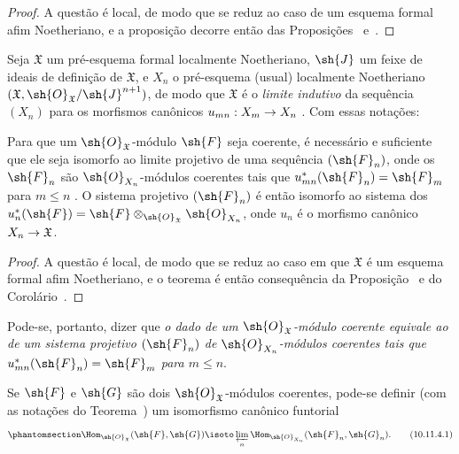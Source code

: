 \documentclass[oneside]{amsart}
\makeatletter
\renewcommand{\leq}{\leqslant}
\newcommand{\ega@arrow}[2]{\mathchoice{#1}{#2}{#2}{#2}}
\renewcommand{\to}{\ega@arrow{\longrightarrow}{\rightarrow}}
\let\EGAOriginalLabel\label
\renewcommand{\label}[1]{\phantomsection\EGAOriginalLabel{#1}}
\makeatother
\begin{document}
\begin{proof}
A questão é local, de modo que se reduz ao caso de um esquema formal afim Noetheriano, e a proposição decorre então das Proposições~ e~.
\end{proof}

\begin{env}[10.11.2]
\label{I.10.11.2}
Seja $\mathfrak{X}$ um pré-esquema formal localmente Noetheriano, $\sh{J}$ um feixe de ideais de definição de $\mathfrak{X}$, e $X_n$ o pré-esquema (usual) localmente Noetheriano $(\mathfrak{X},\sh{O}_\mathfrak{X}/\sh{J}^{n+1})$, de modo que $\mathfrak{X}$ é o \emph{limite indutivo} da sequência $(X_n)$ para os morfismos canônicos $u_{mn}:X_m\to X_n$ .
Com essas notações:
\end{env}

\begin{theorem}[10.11.3]
\label{I.10.11.3}
Para que um $\sh{O}_\mathfrak{X}$-módulo $\sh{F}$ seja coerente, é necessário e suficiente que ele seja isomorfo ao limite projetivo de uma sequência $(\sh{F}_n)$, onde os $\sh{F}_n$ são $\sh{O}_{X_n}$-módulos coerentes tais que $u_{mn}^*(\sh{F}_n)=\sh{F}_m$ para $m\leq n$ .
O sistema projetivo $(\sh{F}_n)$ é então isomorfo ao sistema dos $u_n^*(\sh{F})=\sh{F}\otimes_{\sh{O}_\mathfrak{X}}\sh{O}_{X_n}$, onde $u_n$ é o morfismo canônico $X_n\to\mathfrak{X}$.
\end{theorem}

\begin{proof}
A questão é local, de modo que se reduz ao caso em que $\mathfrak{X}$ é um esquema formal afim Noetheriano, e o teorema é então consequência da Proposição~ e do Corolário~.
\end{proof}

Pode-se, portanto, dizer que \emph{o dado de um $\sh{O}_\mathfrak{X}$-módulo coerente equivale ao de um sistema projetivo $(\sh{F}_n)$ de $\sh{O}_{X_n}$-módulos coerentes tais que $u_{mn}^*(\sh{F}_n)=\sh{F}_m$ para $m\leq n$}.

\begin{corollary}[10.11.4]
\label{I.10.11.4}
Se $\sh{F}$ e $\sh{G}$ são dois $\sh{O}_\mathfrak{X}$-módulos coerentes, pode-se definir (com as notações do Teorema~) um isomorfismo canônico funtorial
\[
\label{I.10.11.4.1}
  \Hom_{\sh{O}_\mathfrak{X}}(\sh{F},\sh{G})\isoto\varprojlim_n\Hom_{\sh{O}_{X_n}}(\sh{F}_n,\sh{G}_n).
  \tag{10.11.4.1}
\]
\end{corollary}
\end{document}
